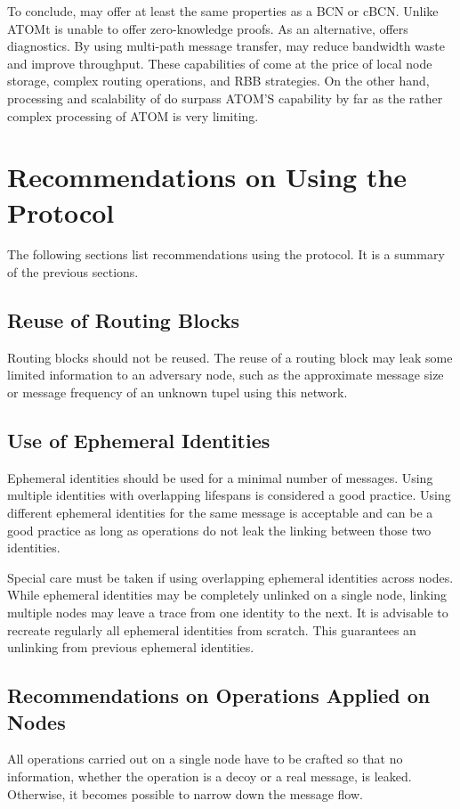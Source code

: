 To conclude, \MessageVortex{} may offer at least the same properties as a BCN or cBCN. Unlike ATOMt is unable to offer zero-knowledge proofs. As an alternative, \MessageVortex{} offers diagnostics. By using multi-path message transfer, \MessageVortex{} may reduce bandwidth waste and improve throughput. These capabilities of \MessageVortex{} come at the price of local node storage, complex routing operations, and RBB strategies. On the other hand, processing and scalability of \MessageVortex{} do surpass ATOM'S capability by far as the rather complex processing of ATOM is very limiting.

\chapter{Recommendations on Using the \MessageVortex{} Protocol}
The following sections list recommendations using the \MessageVortex{} protocol. It is a summary of the previous sections.

\section{Reuse of Routing Blocks\label{sec:reuseRB}}
Routing blocks should not be reused. The reuse of a routing block may leak some limited information to an adversary node, such as the approximate message size or message frequency of an unknown tupel using this network.

\section{Use of Ephemeral Identities}
Ephemeral identities should be used for a minimal number of messages. Using multiple identities with overlapping lifespans is considered a good practice. Using different ephemeral identities for the same message is acceptable and can be a good practice as long as operations do not leak the linking between those two identities.

Special care must be taken if using overlapping ephemeral identities across nodes. While ephemeral identities may be completely unlinked on a single node, linking multiple nodes may leave a trace from one identity to the next. It is advisable to recreate regularly all ephemeral identities from scratch. This guarantees an unlinking from previous ephemeral identities.

\section{Recommendations on Operations Applied on Nodes}
All operations carried out on a single node have to be crafted so that no information, whether the operation is a decoy or a real message, is leaked. Otherwise, it becomes possible to narrow down the message flow.

